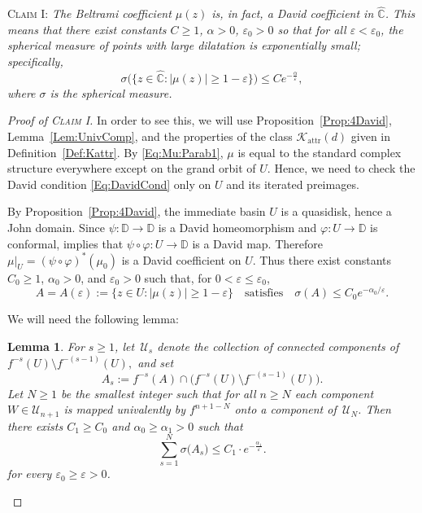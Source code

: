\documentclass[11pt,a4paper, oneside]{amsart}
\newtheorem{lemma}[thm]{Lemma}
\theoremstyle{definition}
\theoremstyle{remark}
\numberwithin{equation}{section}
\def\D{{\mathbb{D}}}
\renewcommand{\ge}{\geqslant}
\renewcommand{\le}{\leqslant}
\newcommand{\eps}{\varepsilon}
\renewcommand{\epsilon}{\varepsilon}
\newcommand{\attr}{{\text{attr}}}
\newcommand{\C}{\mathbb{C}}
\newcommand{\Cc}{\widehat{{\C}}}
\renewcommand{\phi}{\varphi}
\begin{document}
\noindent
\textsc{Claim I:} \textit{The Beltrami coefficient $\mu(z)$ is, in fact, a David coefficient in $\Cc$. This means that there exist constants $C \ge 1$, $\alpha > 0$, $\epsilon_0 > 0$ so that for all $\epsilon < \epsilon_0$, the spherical measure of points with large dilatation is exponentially small; specifically,
\begin{equation}
    \label{Eq:DavidCond}
    \sigma\big(\{z \in \Cc : |\mu(z)| \ge 1-\epsilon\}\big) \le C e^{-\frac{\alpha}{\epsilon}},
\end{equation}
where $\sigma$ is the spherical measure.}
\medskip 

\begin{proof}[Proof of \textsc{Claim I}]
In order to see this, we will use Proposition~\ref{Prop:4David}, Lemma~\ref{Lem:UnivComp}, and the properties of the class $\mathscr K_{\attr}(d)$ given in Definition~\ref{Def:Kattr}. By \eqref{Eq:Mu:Parab1}, $\mu$ is equal to the standard complex structure everywhere except on the grand orbit of $U$. Hence, we need to check the David condition \eqref{Eq:DavidCond} only on $U$ and its iterated preimages. 

By Proposition~\ref{Prop:4David}, the immediate basin $U$ is a
	quasidisk, hence a John domain. Since $\psi \colon \D\to\D$ is a David
	homeomorphism and $\phi \colon U\to\D$ is conformal, 
	\cite[Proposition~2.5(iv)]{LMMN} implies that
	$\psi\circ\phi \colon U\to\D$ is a David map. Therefore
	$\mu|_U=(\psi\circ\phi)^*(\mu_0)$ is a David coefficient on $U$. Thus
	there exist constants $C_0\ge1$, $\alpha_0>0$, and $\eps_0>0$ such that,
	for $0<\eps\le\eps_0$,
\[
{
	A=A(\eps):=\{z\in U:|\mu(z)|\ge1-\eps\}
	\quad\text{satisfies}\quad
	\sigma(A)\le C_0 e^{-\alpha_0/\eps}.}
\]



We will need the following lemma:
\begin{lemma}
\label{Lem:SphEuc}
        {For $s\ge1$, let $\,\mathcal U_s$ denote the collection of connected components of $f^{-s}(U)\setminus f^{-(s-1)}(U),$ and set}
    	\[
    	{
    		A_s:=f^{-s}(A)\cap\big(f^{-s}(U)\setminus f^{-(s-1)}(U)\big).}
    	\]
    Let $N \ge 1$ be the smallest integer such that for all $n \ge N$ each component $W\in \mathcal U_{n+1}$ is mapped univalently by $f^{n+1-N}$ onto a component of $\,\mathcal U_N$. Then there exists $C_1 \ge C_0$ and $\alpha_0 \ge \alpha_1>0$  such that
    \[
    \sum \limits_{s=1}^N \sigma\big({A_s}\big) \le C_1 \cdot e^{-\frac{\alpha_1}{\eps}}.
    \]
    for every $\eps_0 \ge \eps > 0$.


\end{lemma}
\end{proof}
\end{document}
